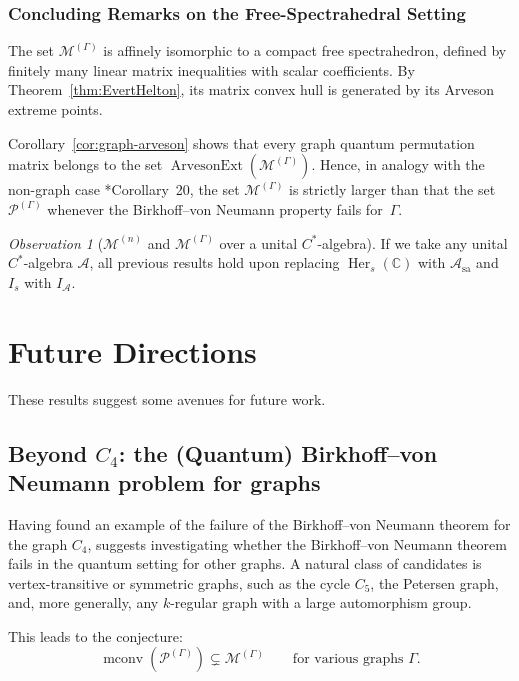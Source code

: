 \documentclass[11pt, a4paper]{article}
\theoremstyle{plain}
\theoremstyle{definition}
\theoremstyle{remark}
\newtheorem{observation}[theorem]{Observation}
\newcommand{\C}{\mathbb{C}}
\newcommand{\Her}[2][\C]{\operatorname{Her}_{#2}(#1)}
\begin{document}
\subsubsection{Concluding Remarks on the Free-Spectrahedral Setting}

The set \(\mathcal{M}^{(\Gamma)}\) is  affinely isomorphic to a compact free spectrahedron,
defined by finitely many linear matrix inequalities with scalar coefficients.
By Theorem~\ref{thm:EvertHelton},
its matrix convex hull is generated by its Arveson extreme points.

Corollary~\ref{cor:graph-arveson} shows that every graph quantum permutation
matrix belongs to the set \(\operatorname{ArvesonExt}(\mathcal{M}^{(\Gamma)})\).
Hence, in analogy with the non-graph case
\cite{DDN20}*{Corollary~20}, the set
\(\mathcal{M}^{(\Gamma)}\) is strictly larger than that the set
\(\mathcal{P}^{(\Gamma)}\) whenever the Birkhoff--von Neumann property fails
for~\(\Gamma\).

\begin{observation}[\(\mathcal{M}^{(n)}\) and \(\mathcal{M}^{(\Gamma)}\) over a unital \(C^*\)-algebra]
If we take any unital \(C^*\)-algebra \(\mathcal{A}\), all previous results
hold upon replacing \(\Her{s}\) with \(\mathcal{A}_{\mathrm{sa}}\)
and \(I_s\) with \(I_{\mathcal{A}}\).
\end{observation}

\section{Future Directions}

These results suggest some avenues for future work.

\subsection{Beyond \(C_4\): the (Quantum) Birkhoff--von Neumann problem for graphs}

Having found an example of the failure of the Birkhoff--von Neumann theorem for the graph \(C_4\), suggests investigating whether
the Birkhoff--von Neumann theorem fails in the quantum setting for other graphs.
A natural class of candidates is vertex-transitive or symmetric graphs,
such as the cycle \(C_5\), the Petersen graph, and, more generally, any \(k\)-regular graph
with a large automorphism group.

This leads to the conjecture:
\[
\operatorname{mconv}(\mathcal P^{(\Gamma)}) 
\subsetneq 
\mathcal M^{(\Gamma)} \qquad \text{for various graphs }\Gamma.
\]
\end{document}
